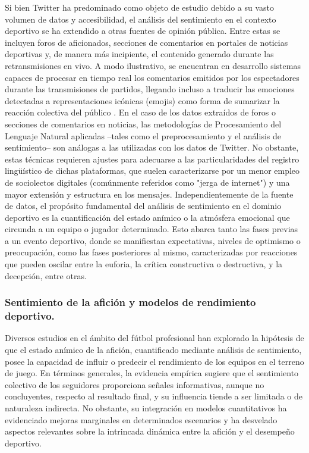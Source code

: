 Si bien Twitter ha predominado como objeto de estudio debido a su vasto volumen de datos y accesibilidad, el análisis del sentimiento en el contexto deportivo se ha extendido a otras fuentes de opinión pública. Entre estas se incluyen foros de aficionados, secciones de comentarios en portales de noticias deportivas y, de manera más incipiente, el contenido generado durante las retransmisiones en vivo. A modo ilustrativo, se encuentran en desarrollo sistemas capaces de procesar en tiempo real los comentarios emitidos por los espectadores durante las transmisiones de partidos, llegando incluso a traducir las emociones detectadas a representaciones icónicas (emojis) como forma de sumarizar la reacción colectiva del público \cite{Ortu2024}. En el caso de los datos extraídos de foros o secciones de comentarios en noticias, las metodologías de Procesamiento del Lenguaje Natural aplicadas –tales como el preprocesamiento y el análisis de sentimiento– son análogas a las utilizadas con los datos de Twitter. No obstante, estas técnicas requieren ajustes para adecuarse a las particularidades del registro lingüístico de dichas plataformas, que suelen caracterizarse por un menor empleo de sociolectos digitales (comúnmente referidos como "jerga de internet") y una mayor extensión y estructura en los mensajes. Independientemente de la fuente de datos, el propósito fundamental del análisis de sentimiento en el dominio deportivo es la cuantificación del estado anímico o la atmósfera emocional que circunda a un equipo o jugador determinado. Esto abarca tanto las fases previas a un evento deportivo, donde se manifiestan expectativas, niveles de optimismo o preocupación, como las fases posteriores al mismo, caracterizadas por reacciones que pueden oscilar entre la euforia, la crítica constructiva o destructiva, y la decepción, entre otras.

\subsubsection{Sentimiento de la afición y modelos de rendimiento deportivo.}

Diversos estudios en el ámbito del fútbol profesional han explorado la hipótesis de que el estado anímico de la afición, cuantificado mediante análisis de sentimiento, posee la capacidad de influir o predecir el rendimiento de los equipos en el terreno de juego. En términos generales, la evidencia empírica sugiere que el sentimiento colectivo de los seguidores proporciona señales informativas, aunque no concluyentes, respecto al resultado final, y su influencia tiende a ser limitada o de naturaleza indirecta. No obstante, su integración en modelos cuantitativos ha evidenciado mejoras marginales en determinados escenarios y ha desvelado aspectos relevantes sobre la intrincada dinámica entre la afición y el desempeño deportivo.\\

